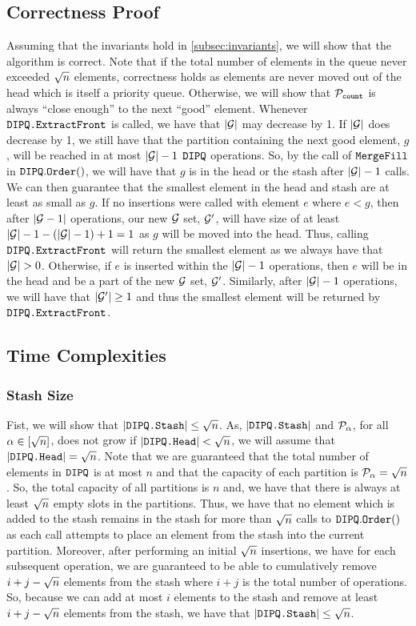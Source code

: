 \subsection{Correctness Proof}
Assuming that the invariants hold in \cref{subsec:invariants}, we will show that the algorithm is correct.
Note that if the total number of elements in the queue never exceeded ${\sqrt{n}}$ elements, correctness holds as elements are never moved out of the head which is itself a priority queue.
Otherwise, we will show that $\mathcal{P}_{\texttt{count}}$ is always ``close enough'' to the next ``good'' element.
Whenever $\texttt{DIPQ.ExtractFront}$ is called, we have that $|\mathcal{G}|$ may decrease by 1. If $|\mathcal{G}|$ does decrease by 1,
we still have that the partition containing the next good element, $g$, will be reached in at most $|\mathcal{G}| - 1$ $\texttt{DIPQ}$ operations.
So, by the call of $\texttt{MergeFill}$ in $\texttt{DIPQ}.\texttt{Order}()$, we will have that $g$ is in the head or the stash
after $|\mathcal{G}| - 1$ calls. 
We can then guarantee that the smallest element in the head and stash are at least as small as $g$.
If no insertions were called with element $e$ where $e < g$,
then after $|\mathcal{G} - 1|$ operations, our new $\mathcal{G}$ set, $\mathcal{G}'$, will have size of at least $|\mathcal{G}| - 1 - (|\mathcal{G}| - 1) + 1 = 1$
as $g$ will be moved into the head. Thus, calling $\texttt{DIPQ.ExtractFront}$ will return the smallest element as we always have that $|\mathcal{G}| > 0$.
Otherwise, if $e$ is inserted within the $|\mathcal{G}| - 1$ operations, then $e$ will be in the head and be a part of the new $\mathcal{G}$ set, $\mathcal{G}'$.
Similarly, after $|\mathcal{G}| - 1$ operations, we will have that $|\mathcal{G}'| \geq 1$ and thus the smallest element will be returned by $\texttt{DIPQ.ExtractFront}$.


\subsection{Time Complexities}
\subsubsection{Stash Size}
Fist, we will show that $|\texttt{DIPQ.Stash}| \leq {\sqrt{n}}$. As, $|\texttt{DIPQ.Stash}|$ and $\mathcal{P}_\alpha$, for all $\alpha \in [{\sqrt{n}}]$, does not grow if $|\texttt{DIPQ.Head}| < {\sqrt{n}}$,
we will assume that $|\texttt{DIPQ.Head}| = {\sqrt{n}}$. 
Note that we are guaranteed that the total number of elements in $\texttt{DIPQ}$ is at most $n$ and that the capacity of each partition is $\mathcal{P}_\alpha = {\sqrt{n}}$.
So, the total capacity of all partitions is $n$ and, we have that there is always at least ${\sqrt{n}}$ empty slots in the partitions.
Thus, we have that no element which is added to the stash remains
in the stash for more than ${\sqrt{n}}$ calls to $\texttt{DIPQ}.\texttt{Order}()$ as each call attempts to place an element from the stash into the current partition.
Moreover, after performing an initial ${\sqrt{n}}$ insertions, we have for each subsequent operation, 
we are guaranteed to be able to cumulatively remove $i + j - {\sqrt{n}}$ elements from the stash where $i + j$ is the total number of operations.
So, because we can add at most $i$ elements to the stash and remove at least $i + j - {\sqrt{n}}$ elements from the stash, we have that $|\texttt{DIPQ.Stash}| \leq {\sqrt{n}}$.


